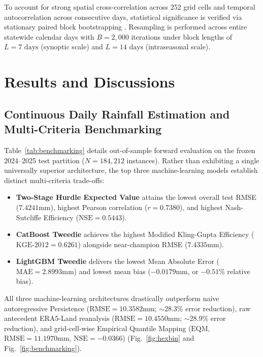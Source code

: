 \documentclass[12pt]{article}
\begin{document}
To account for strong spatial cross-correlation across 252 grid cells and temporal autocorrelation across consecutive days, statistical significance is verified via stationary paired block bootstrapping \cite{kunsch1989, politis1994}. Resampling is performed across entire statewide calendar days with $B = 2,000$ iterations under block lengths of $L = 7\text{ days}$ (synoptic scale) and $L = 14\text{ days}$ (intraseasonal scale).

\newpage
\section{Results and Discussions}

\subsection{Continuous Daily Rainfall Estimation and Multi-Criteria Benchmarking}
Table~\ref{tab:benchmarking} details out-of-sample forward evaluation on the frozen 2024--2025 test partition ($N = 184,212$ instances). Rather than exhibiting a single universally superior architecture, the top three machine-learning models establish distinct multi-criteria trade-offs:
\begin{itemize}
    \item \textbf{Two-Stage Hurdle Expected Value} attains the lowest overall test RMSE ($7.4241$\;mm), highest Pearson correlation ($r = 0.7380$), and highest Nash-Sutcliffe Efficiency ($\text{NSE} = 0.5443$).
    \item \textbf{CatBoost Tweedie} achieves the highest Modified Kling-Gupta Efficiency ($\text{KGE-2012} = 0.6261$) alongside near-champion RMSE ($7.4335$\;mm).
    \item \textbf{LightGBM Tweedie} delivers the lowest Mean Absolute Error ($\text{MAE} = 2.8993$\;mm) and lowest mean bias ($-0.0179$\;mm, or $-0.51\%$ relative bias).
\end{itemize}

All three machine-learning architectures drastically outperform naive autoregressive Persistence ($\text{RMSE} = 10.3582$\;mm; $\sim$28.3\% error reduction), raw antecedent ERA5-Land reanalysis ($\text{RMSE} = 10.4550$\;mm; $\sim$28.9\% error reduction), and grid-cell-wise Empirical Quantile Mapping ($\text{EQM}$, $\text{RMSE} = 11.1970$\;mm, $\text{NSE} = -0.0366$) (Fig.~\ref{fig:hexbin} and Fig.~\ref{fig:benchmarking}).
\end{document}
